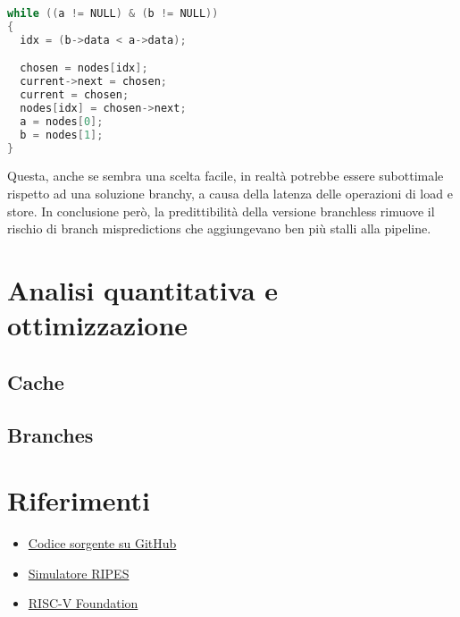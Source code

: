 \documentclass[a4paper,12pt]{article}
\begin{document}
\begin{lstlisting}[language=C]
while ((a != NULL) & (b != NULL))
{
  idx = (b->data < a->data);

  chosen = nodes[idx];
  current->next = chosen;
  current = chosen;
  nodes[idx] = chosen->next;
  a = nodes[0];
  b = nodes[1];
}
\end{lstlisting}

Questa, anche se sembra una scelta facile, in realtà potrebbe essere subottimale rispetto ad una soluzione branchy, a causa della latenza delle operazioni di load e store. In conclusione però, la predittibilità della versione branchless rimuove il rischio di branch mispredictions che aggiungevano ben più stalli alla pipeline.

\section{Analisi quantitativa e ottimizzazione}

\subsection{Cache}

\subsection{Branches}

\section{Riferimenti}

\begin{itemize}
    \item \href{https://github.com/Raimo33/LinkedList}{Codice sorgente su GitHub}
    \item \href{https://github.com/mortbopet/Ripes}{Simulatore RIPES}
    \item \href{https://riscv.org/}{RISC-V Foundation}
\end{itemize}
\end{document}
